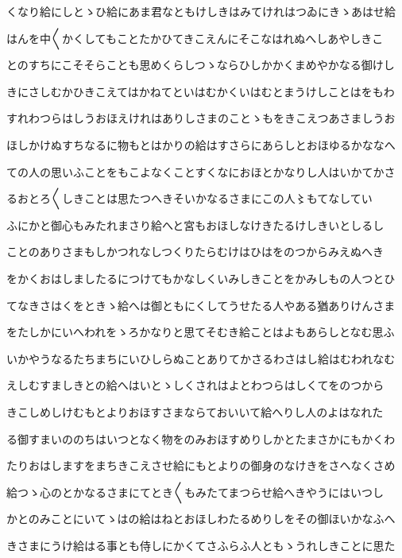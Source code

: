 \documentclass[a4paper,11pt,landscape]{ltjtarticle}
\begin{document}
\par\medskip
くなり給にしとゝひ給にあま君なともけしきはみてけれはつゐにきゝあはせ給
\par\medskip
はんを中〱かくしてもことたかひてきこえんにそこなはれぬへしあやしきこ
\par\medskip
とのすちにこそそらことも思めくらしつゝならひしかかくまめやかなる御けし
\par\medskip
きにさしむかひきこえてはかねてといはむかくいはむとまうけしことはをもわ
\par\medskip
すれわつらはしうおほえけれはありしさまのことゝもをきこえつあさましうお
\par\medskip
ほしかけぬすちなるに物もとはかりの給はすさらにあらしとおほゆるかななへ
\par\medskip
ての人の思いふことをもこよなくことすくなにおほとかなりし人はいかてかさ
\par\medskip
るおとろ〱しきことは思たつへきそいかなるさまにこの人〻もてなしてい
\par\medskip
ふにかと御心もみたれまさり給へと宮もおほしなけきたるけしきいとしるし
\par\medskip
ことのありさまもしかつれなしつくりたらむけはひはをのつからみえぬへき
\par\medskip
をかくおはしましたるにつけてもかなしくいみしきことをかみしもの人つとひ
\par\medskip
てなきさはくをときゝ給へは御ともにくしてうせたる人やある猶ありけんさま
\par\medskip
をたしかにいへわれをゝろかなりと思てそむき給ことはよもあらしとなむ思ふ
\par\medskip
いかやうなるたちまちにいひしらぬことありてかさるわさはし給はむわれなむ
\par\medskip
えしむすましきとの給へはいとゝしくされはよとわつらはしくてをのつから
\par\medskip
きこしめしけむもとよりおほすさまならておいいて給へりし人のよはなれた
\par\medskip
る御すまいののちはいつとなく物をのみおほすめりしかとたまさかにもかくわ
\par\medskip
たりおはしますをまちきこえさせ給にもとよりの御身のなけきをさへなくさめ
\par\medskip
給つゝ心のとかなるさまにてとき〱もみたてまつらせ給へきやうにはいつし
\par\medskip
かとのみことにいてゝはの給はねとおほしわたるめりしをその御ほいかなふへ
\par\medskip
きさまにうけ給はる事とも侍しにかくてさふらふ人ともゝうれしきことに思た
\par\medskip
\end{document}
